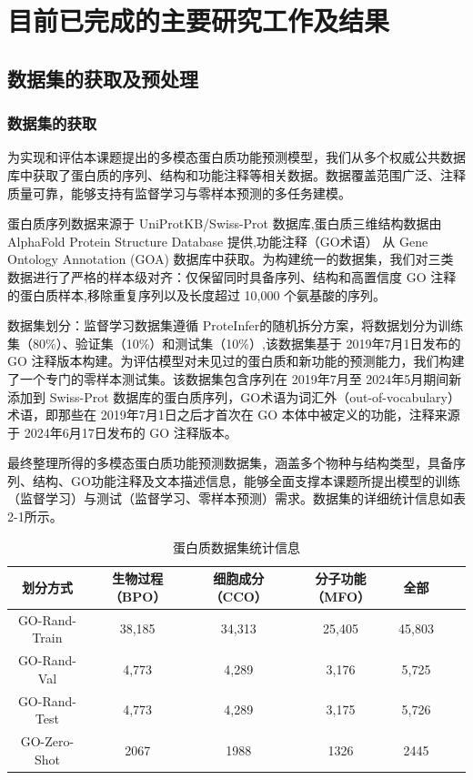 

\chapter{目前已完成的主要研究工作及结果}
\section{数据集的获取及预处理}
\subsection{数据集的获取}
为实现和评估本课题提出的多模态蛋白质功能预测模型，我们从多个权威公共数据库中获取了蛋白质的序列、结构和功能注释等相关数据。数据覆盖范围广泛、注释质量可靠，能够支持有监督学习与零样本预测的多任务建模。

蛋白质序列数据来源于 UniProtKB/Swiss-Prot 数据库\cite{uniprot2023uniprot},蛋白质三维结构数据由 AlphaFold Protein Structure Database \cite{varadi2022alphafold}提供,功能注释（GO术语） 从 Gene Ontology Annotation (GOA) 数据库\cite{huntley2015goa}中获取。为构建统一的数据集，我们对三类数据进行了严格的样本级对齐：仅保留同时具备序列、结构和高置信度 GO 注释的蛋白质样本,移除重复序列以及长度超过 10,000 个氨基酸的序列。

数据集划分：监督学习数据集遵循 ProteInfer\cite{sanderson2023proteinfer}的随机拆分方案，将数据划分为训练集（80\%）、验证集（10\%）和测试集（10\%）,该数据集基于 2019年7月1日发布的 GO 注释版本构建。为评估模型对未见过的蛋白质和新功能的预测能力，我们构建了一个专门的零样本测试集。该数据集包含序列在 2019年7月至 2024年5月期间新添加到 Swiss-Prot 数据库的蛋白质序列，GO术语为词汇外（out-of-vocabulary）术语，即那些在 2019年7月1日之后才首次在 GO 本体中被定义的功能，注释来源于 2024年6月17日发布的 GO 注释版本。

最终整理所得的多模态蛋白质功能预测数据集，涵盖多个物种与结构类型，具备序列、结构、GO功能注释及文本描述信息，能够全面支撑本课题所提出模型的训练（监督学习）与测试（监督学习、零样本预测）需求。数据集的详细统计信息如表2-1所示。
\begin{table}[h!]
\centering
\caption{蛋白质数据集统计信息}
\begin{tabular}{@{}ccccccc@{}}

\toprule
划分方式 & 生物过程（BPO） & 细胞成分（CCO） & 分子功能（MFO） & 全部 \\
\midrule
GO-Rand-Train & 38,185 & 34,313 & 25,405 & 45,803 \\
GO-Rand-Val & 4,773 & 4,289 & 3,176 & 5,725 \\
GO-Rand-Test & 4,773 & 4,289 & 3,175 & 5,726 \\
GO-Zero-Shot &2067  &1988  &1326  & 2445 \\
\bottomrule
\end{tabular}
\end{table}
